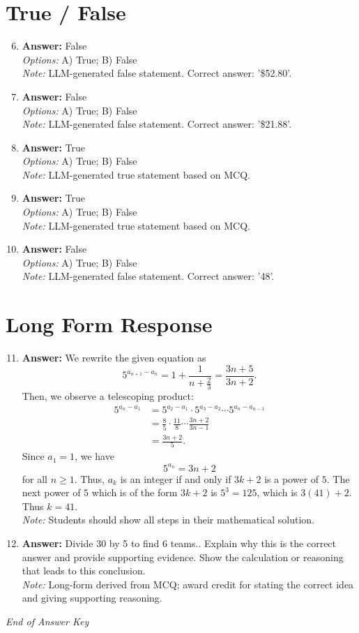 \documentclass[12pt]{article}
\begin{document}
\section*{True / False}
\begin{enumerate}[label=\arabic*.]
\setcounter{enumi}{5}
\item \textbf{Answer:} False
\\ \textit{Options:} A) True; B) False
\\ \textit{Note:} LLM-generated false statement. Correct answer: '\$52.80'.
\item \textbf{Answer:} False
\\ \textit{Options:} A) True; B) False
\\ \textit{Note:} LLM-generated false statement. Correct answer: '\$21.88'.
\item \textbf{Answer:} True
\\ \textit{Options:} A) True; B) False
\\ \textit{Note:} LLM-generated true statement based on MCQ.
\item \textbf{Answer:} True
\\ \textit{Options:} A) True; B) False
\\ \textit{Note:} LLM-generated true statement based on MCQ.
\item \textbf{Answer:} False
\\ \textit{Options:} A) True; B) False
\\ \textit{Note:} LLM-generated false statement. Correct answer: '48'.
\end{enumerate}

\section*{Long Form Response}
\begin{enumerate}[label=\arabic*.]
\setcounter{enumi}{10}
\item \textbf{Answer:} We rewrite the given equation as \[5^{a_{n+1} - a_n} = 1 + \frac{1}{n +\frac{2}{3}} = \frac{3 n+5}{3 n+2}.\]Then, we observe a telescoping product: \[\begin{aligned} 5^{a_n - a_1} &= 5^{a_2 - a_1} \cdot 5^{a_3-a_2} \cdots 5^{a_n - a_{n-1}} \\ &= \frac{8}{5} \cdot \frac{11}{8} \cdots \frac{3 n+2}{3 n-1} \\ &= \frac{3 n+2}{5}. \end{aligned}\]Since $a_1 = 1$, we have \[5^{a_n} = 3 n+2\]for all $n \ge 1$. Thus, $a_k$ is an integer if and only if $3 k+2$ is a power of $5$. The next power of $5$ which is of the form $3 k+2$ is $5^3 = 125$, which is $3(41) + 2$. Thus $k = \boxed{41}$.
\\ \textit{Note:} Students should show all steps in their mathematical solution.
\item \textbf{Answer:} Divide 30 by 5 to find 6 teams.. Explain why this is the correct answer and provide supporting evidence. Show the calculation or reasoning that leads to this conclusion.
\\ \textit{Note:} Long-form derived from MCQ; award credit for stating the correct idea and giving supporting reasoning.
\end{enumerate}

\vfill
\noindent\textit{End of Answer Key}
\end{document}
